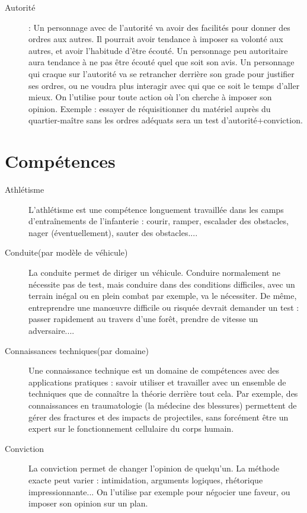 \documentclass{report}
\begin{document}
\begin{multicols}{2}
\begin{description}
    \item[Autorité]: Un personnage avec de l'autorité va avoir des facilités pour donner des ordres aux autres. Il pourrait avoir tendance à imposer sa volonté aux autres, et avoir l'habitude d'être écouté. Un personnage peu autoritaire aura tendance à ne pas être écouté quel que soit son avis. Un personnage qui craque sur l'autorité va se retrancher derrière son grade pour justifier ses ordres, ou ne voudra plus interagir avec qui que ce soit le temps d'aller mieux. On l'utilise pour toute action où l'on cherche à imposer son opinion. Exemple : essayer de réquisitionner du matériel auprès du quartier-maître sans les ordres adéquats sera un test d'autorité+conviction.
\end{description}
\section{Compétences}
\begin{description}
    \item[Athlétisme] L'athlétisme est une compétence longuement travaillée dans les camps d'entraînements de l'infanterie : courir, ramper, escalader des obstacles, nager (éventuellement), sauter des obstacles.... 
    \item[Conduite(par modèle de véhicule)] La conduite permet de diriger un véhicule. Conduire normalement ne nécessite pas de test, mais conduire dans des conditions difficiles, avec un terrain inégal ou en plein combat par exemple, va le nécessiter. De même, entreprendre une manœuvre difficile ou risquée devrait demander un test : passer rapidement au travers d'une forêt, prendre de vitesse un adversaire....
    \item[Connaissances techniques(par domaine)] Une connaissance technique est un domaine de compétences avec des applications pratiques : savoir utiliser et travailler avec un ensemble de techniques que de connaître la théorie derrière tout cela. Par exemple, des connaissances en traumatologie (la médecine des blessures) permettent de gérer des fractures et des impacts de projectiles, sans forcément être un expert sur le fonctionnement cellulaire du corps humain.
    \item[Conviction] La conviction permet de changer l'opinion de quelqu'un. La méthode exacte peut varier : intimidation, arguments logiques, rhétorique impressionnante... On l'utilise par exemple pour négocier une faveur, ou imposer son opinion sur un plan.

\end{description}
\end{multicols}
\end{document}
